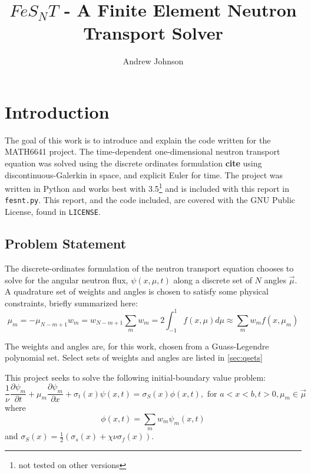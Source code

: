 \documentclass{article}
\title{$FeS_NT$ - A Finite Element Neutron Transport Solver}
\author{Andrew Johnson}
\newcommand{\pdiff}[2]{\frac{\partial#1}{\partial#2}}
\newcommand{\ddx}[1]{\pdiff{#1}{x}}
\newcommand{\ddt}[1]{\pdiff{#1}{t}}
\newcommand{\dpmdx}{\ddx{\psi_m}}
\newcommand{\dpmdt}{\ddt{\psi_m}}
\newcommand{\fisTrms}{\chi\nu\sigma_f}
\newcommand{\tfor}{\text{ for }}
\begin{document}
\maketitle

\section{Introduction}
The goal of this work is to introduce and explain the code written for the MATH6641 project.
The time-dependent one-dimensional neutron transport equation was solved using the discrete 
ordinates formulation \textbf{cite} using discontinuous-Galerkin in space, and
explicit Euler for time.
The project was written in Python and works best with 3.5\footnote{not tested on other versions}
and is included with this report in \texttt{fesnt.py}.
This report, and the code included, are covered with the GNU Public License, found in \texttt{LICENSE}.

\subsection{Problem Statement}
The discrete-ordinates formulation of the neutron transport equation chooses to solve for the angular
neutron flux, $\psi(x, \mu, t)$ along a discrete set of $N$ angles $\vec{\mu}$. A quadrature set of 
weights and angles is chosen to satisfy some physical constraints, briefly summarized here:
\begin{subequations} \label{eq:quadRules}
    \begin{equation}
        \mu_m = -\mu_{N-m+1}
    \end{equation}
    \begin{equation}
        w_m = w_{N-m+1}
    \end{equation}
    \begin{equation}
        \sum_m w_m = 2
    \end{equation}
    \begin{equation}
        \int_{-1}^1f(x, \mu)d\mu\approx\sum_mw_m f(x, \mu_m)
    \end{equation}
\end{subequations}

The weights and angles are, for this work, chosen from a Guass-Legendre polynomial set.
Select sets of weights and angles are listed in \cref{sec:qsets}

This project seeks to solve the following initial-boundary value problem:
\begin{equation} \label{eq:ibvpNTE}
    \frac{1}{\nu}\dpmdt+\mu_m\dpmdx+\sigma_t(x)\psi(x, t) = 
    \sigma_S(x)\phi(x, t), \tfor a<x<b,t>0, \mu_m\in\vec{\mu}
\end{equation}
where
\begin{equation}
    \phi(x, t) = \sum_mw_m\psi_m(x, t)
\end{equation}
and $\sigma_S(x) =\frac{1}{2}\left(\sigma_s(x) + \fisTrms(x)\right)$.
\end{document}
